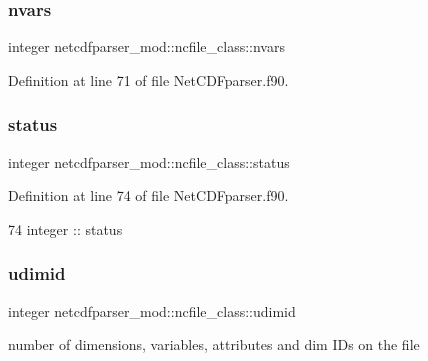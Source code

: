 \subsubsection{\texorpdfstring{nvars}{nvars}}
{\footnotesize\ttfamily integer netcdfparser\+\_\+mod\+::ncfile\+\_\+class\+::nvars\hspace{0.3cm}{\ttfamily [private]}}



Definition at line 71 of file Net\+C\+D\+Fparser.\+f90.

\mbox{\label{structnetcdfparser__mod_1_1ncfile__class_ad5ca70c79d7fb287890f7c0cda5a222c}} 
\subsubsection{\texorpdfstring{status}{status}}
{\footnotesize\ttfamily integer netcdfparser\+\_\+mod\+::ncfile\+\_\+class\+::status\hspace{0.3cm}{\ttfamily [private]}}



Definition at line 74 of file Net\+C\+D\+Fparser.\+f90.


\begin{DoxyCode}
74         \textcolor{keywordtype}{integer} :: status
\end{DoxyCode}
\mbox{\label{structnetcdfparser__mod_1_1ncfile__class_a4ecd4e68d99de349ac131df9572b5738}} 
\subsubsection{\texorpdfstring{udimid}{udimid}}
{\footnotesize\ttfamily integer netcdfparser\+\_\+mod\+::ncfile\+\_\+class\+::udimid\hspace{0.3cm}{\ttfamily [private]}}



number of dimensions, variables, attributes and dim I\+Ds on the file 



